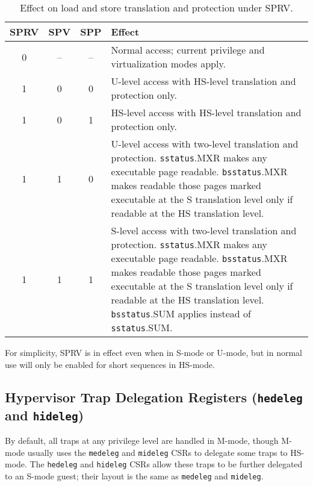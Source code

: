 \begin{table*}[h!]
\begin{center}
\begin{tabular}{|c|c|c||p{5in}|}
  \hline
   SPRV & SPV & SPP & Effect \\ \hline \hline
   0    & --  & --  & Normal access; current privilege and virtualization modes apply. \\ \hline
   1    & 0   & 0   & U-level access with HS-level translation and protection only. \\ \hline
   1    & 0   & 1   & HS-level access with HS-level translation and protection only. \\ \hline
   1    & 1   & 0   & U-level access with two-level translation and protection. {\tt sstatus}.MXR makes any executable page readable.  {\tt bsstatus}.MXR makes readable those pages marked executable at the S translation level only if readable at the HS translation level. \\ \hline
   1    & 1   & 1   & S-level access with two-level translation and protection. {\tt sstatus}.MXR makes any executable page readable.  {\tt bsstatus}.MXR makes readable those pages marked executable at the S translation level only if readable at the HS translation level. {\tt bsstatus}.SUM applies instead of {\tt sstatus}.SUM. \\ \hline
 \end{tabular}
\end{center}
\caption{Effect on load and store translation and protection under SPRV.}
\label{h-sprv}
\end{table*}

\begin{commentary}
For simplicity, SPRV is in effect even when in S-mode or U-mode, but in normal
use will only be enabled for short sequences in HS-mode.
\end{commentary}

\subsection{Hypervisor Trap Delegation Registers ({\tt hedeleg} and {\tt hideleg})}

By default, all traps at any privilege level are handled in M-mode, though
M-mode usually uses the {\tt medeleg} and {\tt mideleg} CSRs to delegate
some traps to HS-mode.  The {\tt hedeleg} and {\tt hideleg} CSRs allow these
traps to be further delegated to an S-mode guest; their layout is the same
as {\tt medeleg} and {\tt mideleg}.

